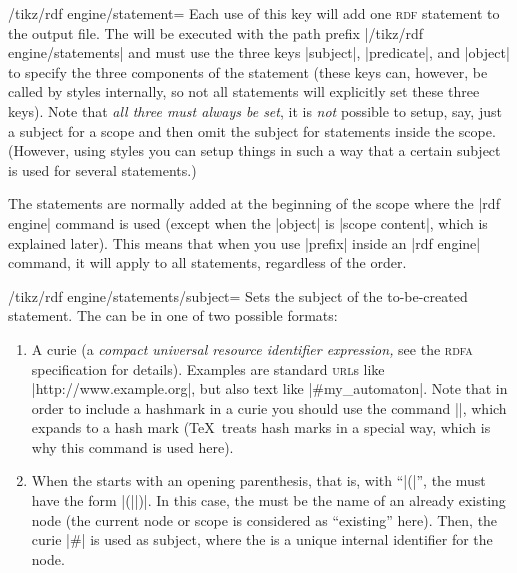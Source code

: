 \begin{key}{/tikz/rdf engine/statement=}
    Each use of this key will add one \textsc{rdf} statement to the output
    file. The  will be executed with the path prefix
    |/tikz/rdf engine/statements| and must use the three keys |subject|,
    |predicate|, and |object| to specify the three components of the statement
    (these keys can, however, be called by styles internally, so not all
    statements will explicitly set these three keys). Note that \emph{all three
    must always be set}, it is \emph{not} possible to setup, say, just a
    subject for a scope and then omit the subject for statements inside the
    scope. (However, using styles you can setup things in such a way that a
    certain subject is used for several statements.)
\begin{codeexample}
\end{codeexample}

    The statements are normally  added at the beginning of the scope where the
    |rdf engine| command is used (except when the |object| is |scope content|,
    which is explained later). This means that when you use |prefix| inside an
    |rdf engine| command, it will apply to all statements, regardless of the
    order.

    \begin{key}{/tikz/rdf engine/statements/subject=}
        Sets the subject of the to-be-created statement. The  can
        be in one of two possible formats:
        \begin{enumerate}
            \item A curie (a \emph{compact universal resource identifier
                expression,} see the \textsc{rdfa} specification for details).
                Examples are standard \textsc{url}s like
                |http://www.example.org|, but also text like |#my_automaton|.
                Note that in order to include a hashmark in a curie you should
                use the command |\tikzrdfhashmark|, which expands to a hash
                mark (\TeX\ treats hash marks in a special way, which is why
                this command is used here).
            \item When the  starts with an opening parenthesis,
                that is, with ``|(|'', the  must have the form
                |(||)|. In this case, the  must be the name of an already existing node
                (the current node or scope is considered as ``existing'' here).
                Then, the curie |#| is used as subject, where the
                 is a unique internal identifier for the node.


\end{enumerate}
\end{key}
\end{key}
